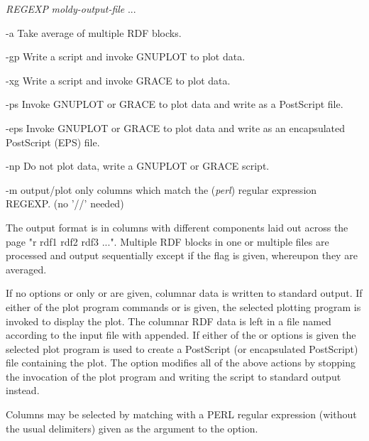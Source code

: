 \documentclass[a4paper,twoside]{report}
\begin{document}
\begin{center}
 \Lit{[-a]} 
 \Lit{[-gp|-xg]}
 \Lit{[-ps|-eps]}
 \Lit{[-np]}
 \Lit{[-m} \textit{REGEXP}\Lit{]} 
 \textit{moldy-output-file} ...
\end{center}

\begin{Argdescription}  
      \item[-a]         Take average of multiple RDF blocks.
      \item[-gp]        Write a script and invoke GNUPLOT to plot data.
      \item[-xg]        Write a script and invoke GRACE to plot data.
      \item[-ps]        Invoke GNUPLOT or GRACE to plot data and write as a PostScript file.
      \item[-eps]       Invoke GNUPLOT or GRACE to plot data and write as an encapsulated PostScript (EPS) file.
      \item[-np]        Do not plot data, write a GNUPLOT or GRACE script.
      \item[-m]  output/plot only columns which match the (\emph{perl}) regular expression REGEXP. (no '//' needed)    
\end{Argdescription}

The output format is in columns with different components laid out
across the page "r rdf1 rdf2 rdf3 ...".  Multiple RDF blocks in one or
multiple files are processed and output sequentially except if the 
flag is given, whereupon they are averaged.

If no options or only  or  are given, columnar data is
written to standard output.  If either of the plot program commands
 or  is given, the selected plotting program is
invoked to display the plot. The columnar RDF data  is left in a file
named according to the input file with  appended.
If either of the  or  options is given the selected
plot program is used to create a PostScript (or encapsulated
PostScript) file containing the plot.  The  option modifies
all of the above actions by stopping the invocation of the plot
program and writing the script to standard output instead.

Columns may be selected by matching with a PERL regular expression
(without the usual delimiters) given as the argument to the 
option.

\end{document}

